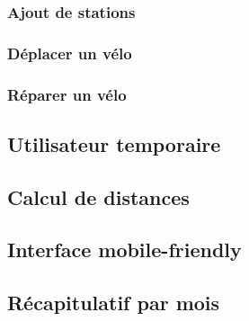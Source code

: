 \documentclass[a4paper,10pt]{article}
\begin{document}
\subsubsection{Ajout de stations}
\subsubsection{Déplacer un vélo}
\subsubsection{Réparer un vélo}

\subsection{Utilisateur temporaire}

\subsection{Calcul de distances}

\subsection{Interface mobile-friendly}

\subsection{Récapitulatif par mois}
\end{document}
